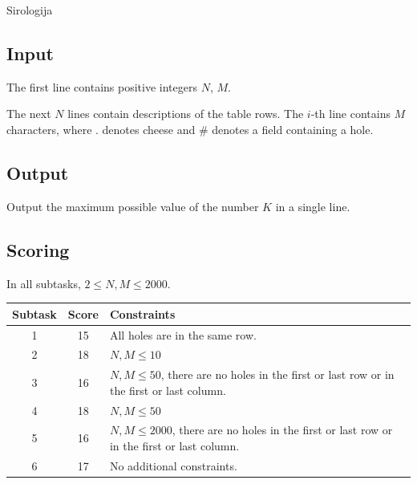 \begin{statement}[
  problempoints=100,
  timelimit=1 second,
  memorylimit=1024 MiB,
]{Sirologija}
\begin{figure}[!h]
\begin{subfigure}{0.49\linewidth}
    \end{subfigure}

  \end{figure}

\subsection*{Input}

The first line contains positive integers $N$, $M$.

The next $N$ lines contain descriptions of the table rows. The $i$-th line contains $M$ characters, where $\texttt{.}$ denotes cheese and $\texttt{\#}$ denotes a field containing a hole.

\subsection*{Output}

Output the maximum possible value of the number $K$ in a single line.

\subsection*{Scoring}

In all subtasks, $2 \leq N, M \leq 2000$.

{\renewcommand{\arraystretch}{1.4}
  \setlength{\tabcolsep}{6pt}
  \begin{tabular}{ccl}
   Subtask & Score & Constraints \\ \midrule
    1 & 15 & All holes are in the same row. \\
    2 & 18 & $N, M \leq 10$ \\
    3 & 16 & $N, M \leq 50$, there are no holes in the first or last row or in the first or last column.\\
    4 & 18 & $N, M \leq 50$ \\
    5 & 16 & $N, M \leq 2000$, there are no holes in the first or last row or in the first or last column.\\
    6 & 17 & No additional constraints. \\
\end{tabular}}


\end{statement}
